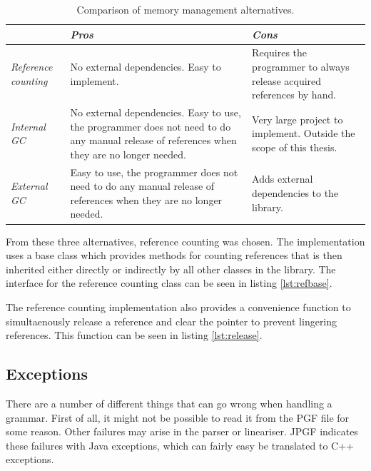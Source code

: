 \begin{table}
\begin{tabularx}{\textwidth}{|l|X|X|}
	\hline
	 & \emph{Pros} & \emph{Cons} \\ \hline
	\emph{Reference counting} & No external dependencies. Easy to implement. & Requires the programmer to always release acquired references by hand. \\ \hline
	\emph{Internal GC} & No external dependencies. Easy to use, the programmer does not need to do any manual release of references when they are no longer needed. & Very large project to implement. Outside the scope of this thesis. \\ \hline
	\emph{External GC} & Easy to use, the programmer does not need to do any manual release of references when they are no longer needed. & Adds external dependencies to the library. \\ \hline
\end{tabularx}
\caption{Comparison of memory management alternatives.}
\label{tbl:memorymanagement}
\end{table}

From these three alternatives, reference counting was chosen. The implementation uses a base class which provides methods for counting references that is then inherited either directly or indirectly by all other classes in the library. The interface for the reference counting class can be seen in listing \ref{lst:refbase}.



The reference counting implementation also provides a convenience function to simultaenously release a reference and clear the pointer to prevent lingering references. This function can be seen in listing \ref{lst:release}.




\subsection{Exceptions}
There are a number of different things that can go wrong when handling a grammar. First of all, it might not be possible to read it from the PGF file for some reason. Other failures may arise in the parser or lineariser. JPGF indicates these failures with Java exceptions, which can fairly easy be translated to C++ exceptions.

